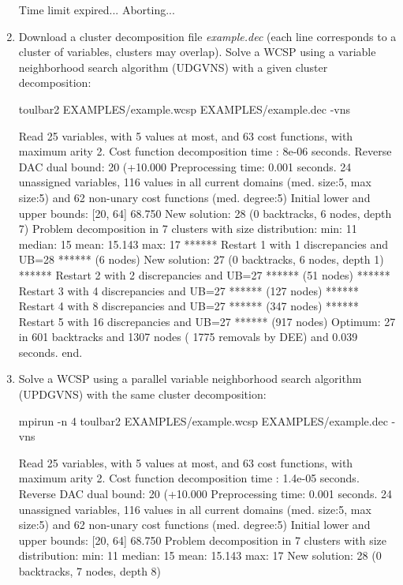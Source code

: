 \begin{enumerate}
{\begin{DoxyCode}
Time limit expired... Aborting...
\end{DoxyCode}}
\item Download a cluster decomposition file {\em example.dec} (each line corresponds to a cluster of variables, clusters may overlap). Solve a WCSP using a variable neighborhood search algorithm (UDGVNS) with a given cluster decomposition:
\begin{DoxyCode}
	toulbar2 EXAMPLES/example.wcsp EXAMPLES/example.dec -vns
\end{DoxyCode}
{\scriptsize
\begin{DoxyCode}
Read 25 variables, with 5 values at most, and 63 cost functions, with maximum arity 2.
Cost function decomposition time : 8e-06 seconds.
Reverse DAC dual bound: 20 (+10.000%
Preprocessing time: 0.001 seconds.
24 unassigned variables, 116 values in all current domains (med. size:5, max size:5) and 62 non-unary cost functions (med. degree:5)
Initial lower and upper bounds: [20, 64] 68.750%
New solution: 28 (0 backtracks, 6 nodes, depth 7)
Problem decomposition in 7 clusters with size distribution: min: 11 median: 15 mean: 15.143 max: 17
****** Restart 1 with 1 discrepancies and UB=28 ****** (6 nodes)
New solution: 27 (0 backtracks, 6 nodes, depth 1)
****** Restart 2 with 2 discrepancies and UB=27 ****** (51 nodes)
****** Restart 3 with 4 discrepancies and UB=27 ****** (127 nodes)
****** Restart 4 with 8 discrepancies and UB=27 ****** (347 nodes)
****** Restart 5 with 16 discrepancies and UB=27 ****** (917 nodes)
Optimum: 27 in 601 backtracks and 1307 nodes ( 1775 removals by DEE) and 0.039 seconds.
end.
\end{DoxyCode}}
\item Solve a WCSP using a parallel variable neighborhood search algorithm (UPDGVNS) with the same cluster decomposition:
\begin{DoxyCode}
	mpirun -n 4 toulbar2 EXAMPLES/example.wcsp EXAMPLES/example.dec -vns
\end{DoxyCode}
{\scriptsize
\begin{DoxyCode}
Read 25 variables, with 5 values at most, and 63 cost functions, with maximum arity 2.
Cost function decomposition time : 1.4e-05 seconds.
Reverse DAC dual bound: 20 (+10.000%
Preprocessing time: 0.001 seconds.
24 unassigned variables, 116 values in all current domains (med. size:5, max size:5) and 62 non-unary cost functions (med. degree:5)
Initial lower and upper bounds: [20, 64] 68.750%
Problem decomposition in 7 clusters with size distribution: min: 11 median: 15 mean: 15.143 max: 17
New solution: 28 (0 backtracks, 7 nodes, depth 8)

\end{DoxyCode}}
\end{enumerate}
